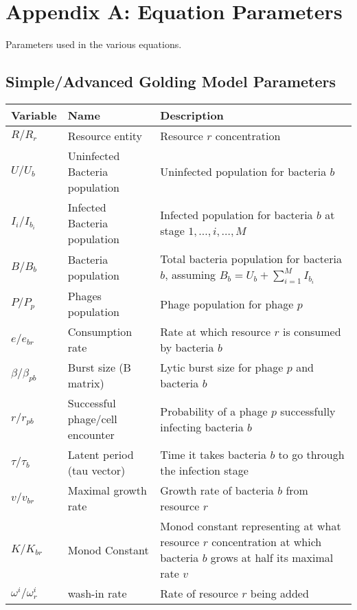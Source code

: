 \chapter{Appendix A: Equation Parameters}
\label{AppendixA}
Parameters used in the various equations. 

\section{Simple/Advanced Golding Model Parameters}
\begin{table}[H]
    \small %
    \centering
    \begin{tabularx}{\textwidth}{l l X}
        \toprule
        \textbf{Variable} & \textbf{Name} & \textbf{Description} \\
        \midrule
        $R / R_r$ & Resource entity & Resource $r$ concentration\\
        $U / U_b$ & Uninfected Bacteria population & Uninfected population for bacteria $b$ \\
        $I_i / I_{b_i}$ & Infected Bacteria population & Infected population for bacteria $b$ at stage $1, \dots, i, \dots, M$ \\
        $B / B_b$ & Bacteria population & Total bacteria population for bacteria $b$, assuming $B_b = U_b + \sum_{i=1}^M I_{b_i}$ \\
        $P / P_p$ & Phages population & Phage population for phage $p$ \\
        $e / e_{b r}$ & Consumption rate & Rate at which resource $r$ is consumed by bacteria $b$\\
        $\beta / \beta_{p b}$ & Burst size (B matrix)& Lytic burst size for phage $p$ and bacteria $b$\\
        $r / r_{p b}$ & Successful phage/cell encounter & Probability of a phage $p$ successfully infecting bacteria $b$\\
        $\tau / \tau_{b}$ & Latent period (tau vector)& Time it takes bacteria $b$ to go through the infection stage\\
        $v / v_{b r}$ & Maximal growth rate & Growth rate of bacteria $b$ from resource $r$ \\
        $K / K_{b r}$ & Monod Constant & Monod constant representing at what resource $r$ concentration at which bacteria $b$ grows at half its maximal rate $v$\\
        $\omega^i / \omega^i_r$ & wash-in rate & Rate of resource $r$ being added\\

\end{tabularx}
\end{table}
